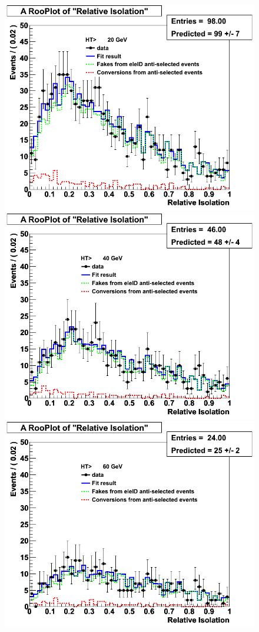 \begin{figure}[ht]
\centering
\includegraphics[scale=0.28]{Plots/caloIso_pt10_ht20.png}
\includegraphics[scale=0.28]{Plots/caloIso_pt10_ht40.png}
\includegraphics[scale=0.28]{Plots/caloIso_pt10_ht60.png}

\end{figure}
